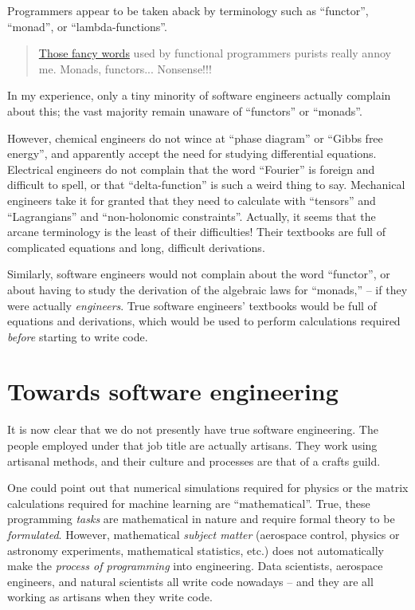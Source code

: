 Programmers appear to be taken aback by terminology such as ``functor'',
``monad'', or ``lambda-functions''.
\begin{quotation}
\href{https://www.cakesolutions.net/teamblogs/those-fancy-words-monads-functors-nonsense}{Those fancy words}
used by functional programmers purists really annoy me. Monads, functors...
Nonsense!!! 
\end{quotation}
In my experience, only a tiny minority of software engineers actually
complain about this; the vast majority remain unaware of ``functors''
or ``monads''.

However, chemical engineers do not wince at ``phase diagram'' or
``Gibbs free energy'', and apparently accept the need for studying
differential equations. Electrical engineers do not complain that
the word ``Fourier'' is foreign and difficult to spell, or that
``delta-function'' is such a weird thing to say. Mechanical engineers
take it for granted that they need to calculate with ``tensors''
and ``Lagrangians'' and ``non-holonomic constraints''. Actually,
it seems that the arcane terminology is the least of their difficulties!
Their textbooks are full of complicated equations and long, difficult
derivations.

Similarly, software engineers would not complain about the word ``functor'',
or about having to study the derivation of the algebraic laws for
``monads,'' – if they were actually \emph{engineers}. True software
engineers' textbooks would be full of equations and derivations, which
would be used to perform calculations required \emph{before} starting
to write code.

\section{Towards software engineering }

It is now clear that we do not presently have true software engineering.
The people employed under that job title are actually artisans. They
work using artisanal methods, and their culture and processes are
that of a crafts guild.

One could point out that numerical simulations required for physics
or the matrix calculations required for machine learning are ``mathematical''.
True, these programming \emph{tasks} are mathematical in nature and
require formal theory to be \emph{formulated}. However, mathematical
\emph{subject matter} (aerospace control, physics or astronomy experiments,
mathematical statistics, etc.) does not automatically make the \emph{process
of programming} into engineering. Data scientists, aerospace engineers,
and natural scientists all write code nowadays – and they are all
working as artisans when they write code.

